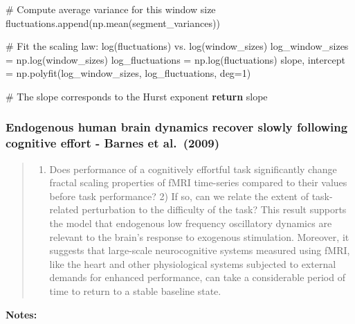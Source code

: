 \documentclass[
  sn-vancouver,
  Numbered,
  referee,
  lineno]{sn-jnl}
\newenvironment{Shaded}{\begin{snugshade}}{\end{snugshade}}
\newcommand{\CommentTok}[1]{\textcolor[rgb]{0.37,0.37,0.37}{#1}}
\newcommand{\ControlFlowTok}[1]{\textcolor[rgb]{0.00,0.23,0.31}{\textbf{#1}}}
\newcommand{\DecValTok}[1]{\textcolor[rgb]{0.68,0.00,0.00}{#1}}
\newcommand{\NormalTok}[1]{\textcolor[rgb]{0.00,0.23,0.31}{#1}}
\newcommand{\OperatorTok}[1]{\textcolor[rgb]{0.37,0.37,0.37}{#1}}
\providecommand{\tightlist}{%
  \setlength{\itemsep}{0pt}\setlength{\parskip}{0pt}}\usepackage{longtable,booktabs,array}
\begin{document}
\begin{Shaded}
\begin{Highlighting}[]
        \CommentTok{\# Compute average variance for this window size}
\NormalTok{        fluctuations.append(np.mean(segment\_variances))}

    \CommentTok{\# Fit the scaling law: log(fluctuations) vs. log(window\_sizes)}
\NormalTok{    log\_window\_sizes }\OperatorTok{=}\NormalTok{ np.log(window\_sizes)}
\NormalTok{    log\_fluctuations }\OperatorTok{=}\NormalTok{ np.log(fluctuations)}
\NormalTok{    slope, intercept }\OperatorTok{=}\NormalTok{ np.polyfit(log\_window\_sizes, log\_fluctuations, deg}\OperatorTok{=}\DecValTok{1}\NormalTok{)}
    
    \CommentTok{\# The slope corresponds to the Hurst exponent}
    \ControlFlowTok{return}\NormalTok{ slope}
\end{Highlighting}
\end{Shaded}

\subsubsection{\texorpdfstring{Endogenous human brain dynamics recover
slowly following cognitive effort - Barnes et al.~(2009)
\citep{barnesEndogenousHumanBrain2009}}{Endogenous human brain dynamics recover slowly following cognitive effort - Barnes et al.~(2009) {[}@barnesEndogenousHumanBrain2009{]}}}\label{endogenous-human-brain-dynamics-recover-slowly-following-cognitive-effort---barnes-et-al.-2009-barnesendogenoushumanbrain2009-2}

\begin{quote}
\begin{enumerate}
\def\labelenumi{\arabic{enumi})}
\tightlist
\item
  Does performance of a cognitively effortful task significantly change
  fractal scaling properties of fMRI time-series compared to their
  values before task performance? 2) If so, can we relate the extent of
  task-related perturbation to the difficulty of the task? This result
  supports the model that endogenous low frequency oscillatory dynamics
  are relevant to the brain's response to exogenous stimulation.
  Moreover, it suggests that large-scale neurocognitive systems measured
  using fMRI, like the heart and other physiological systems subjected
  to external demands for enhanced performance, can take a considerable
  period of time to return to a stable baseline state.
\end{enumerate}
\end{quote}

\textbf{Notes:}
\end{document}
